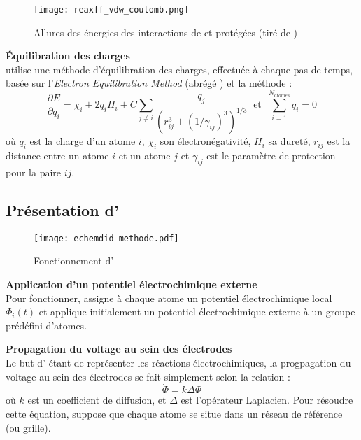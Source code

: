 \begin{figure}[h!]
    \centering
    \texttt{[image: reaxff\_vdw\_coulomb.png]}
    \caption{Allures des énergies des interactions de \vdw{} et \coulomb{} protégées {\tiny (tiré de \cite{russo_atomistic-scale_2011})}}
    \label{fig:reaxff_vdw_coulomb}
\end{figure}

\textbf{Équilibration des charges}\\
\reaxff{} utilise une méthode d'équilibration des charges, effectuée à chaque pas de temps, basée sur l'\emph{Electron Equilibration Method} (abrégé \eem{})\cite{mortier_electronegativity-equalization_2002} et la méthode \qeq{}\cite{rappe_charge_1991} :
\begin{equation}
    \boxed%
    {
    \frac{\partial E}{\partial q_i} = \chi_i + 2 q_i H_i + C \sum_{j \neq i} \frac{q_j}{\left(r_{ij}^3 + (1 / \gamma_{ij})^3\right)^{1/3}}
    }
    \ \text{ et } \ 
    \boxed%
    {
        \sum_{i = 1}^{N_{atomes}} q_i = 0
    }
\end{equation}
où $q_i$ est la charge d'un atome $i$, $\chi_i$ son électronégativité, $H_i$ sa dureté, $r_{ij}$ est la distance entre un atome $i$ et un atome $j$ et $\gamma_{ij}$ est le paramètre de protection pour la paire $ij$.


    \subsection{Présentation d'\echemdid{}} \label{sec:echemdid}

\begin{figure}[h!]
    \centering
    \texttt{[image: echemdid\_methode.pdf]}
    \caption{Fonctionnement d'\echemdid{}}
    \label{fig:echemdid_fonctionnement}
\end{figure}

\textbf{Application d'un potentiel électrochimique externe}\\
Pour fonctionner, \echemdid{} assigne à chaque atome un potentiel électrochimique local $\Phi_i (t)$ et applique initialement un potentiel électrochimique externe à un groupe prédéfini d'atomes.

\textbf{Propagation du voltage au sein des électrodes}\\
Le but d'\echemdid{} étant de représenter les réactions électrochimiques, la progpagation du voltage au sein des électrodes se fait simplement selon la relation :
\begin{equation}
    \dot{\Phi} = k \Delta \Phi
    \label{eq:echemdid_propagation}
\end{equation}
où $k$ est un coefficient de diffusion, et $\Delta$ est l'opérateur Laplacien. Pour résoudre cette équation, \echemdid{} suppose que chaque atome se situe dans un réseau de référence (ou grille).

